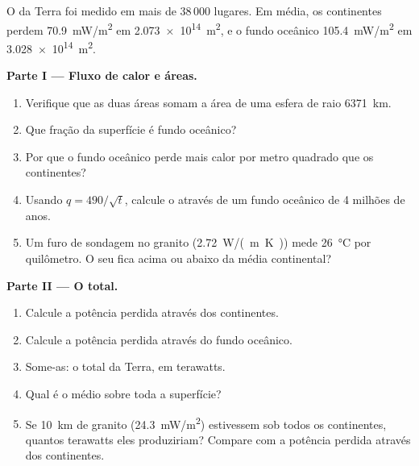 \begin{problem}
\label{pb:g12:internal-heat:1}
O  da Terra foi medido em mais de 38\,000 lugares. Em média,
os continentes perdem \qty{70.9}{mW/m^2} em \qty{2.073e14}{m^2}, e o fundo
oceânico \qty{105.4}{mW/m^2} em \qty{3.028e14}{m^2}.

\medskip
\noindent\textbf{Parte I --- Fluxo de calor e áreas.}
\begin{enumerate}
  \item Verifique que as duas áreas somam a área de uma esfera de raio
        \qty{6371}{km}.
  \item Que fração da superfície é fundo oceânico?
  \item Por que o fundo oceânico perde mais calor por metro quadrado que os
        continentes?
  \item Usando $q = 490/\sqrt{t}$, calcule o  através de um
        fundo oceânico de 4 milhões de anos.
  \item Um furo de sondagem no granito (\qty{2.72}{W/(m.K)}) mede
        \qty{26}{\celsius} por quilômetro. O seu  fica acima
        ou abaixo da média continental?
\end{enumerate}

\medskip
\noindent\textbf{Parte II --- O total.}
\begin{enumerate}[resume]
  \item Calcule a potência perdida através dos continentes.
  \item Calcule a potência perdida através do fundo oceânico.
  \item Some-as: o  total da Terra, em terawatts.
  \item Qual é o  médio sobre toda a superfície?
  \item Se \qty{10}{km} de granito (\qty{24.3}{mW/m^2}) estivessem sob todos
        os continentes, quantos terawatts eles produziriam? Compare com a
        potência perdida através dos continentes.
\end{enumerate}


\end{problem}
